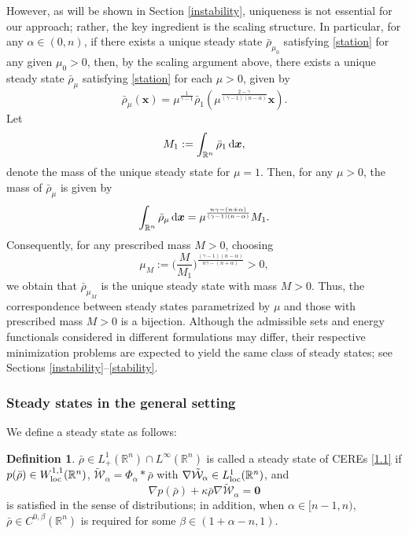 \documentclass[reqno,11pt]{amsart}
\numberwithin{equation}{section}
\theoremstyle{definition}
\newtheorem{definition}[theorem]{Definition}
\def\dd{{\, \rm d}}
\begin{document}
However, as will be shown in Section \ref{instability}, uniqueness is not essential for our approach; 
rather, the key ingredient is the scaling structure.
In particular, for any $\alpha \in (0,n)$, 
if there exists a unique steady state $\bar{\rho}_{\mu_0}$ 
satisfying \eqref{station} for any given $\mu_0 > 0$, 
then, by the scaling argument above, 
there exists a unique steady state $\bar{\rho}_\mu$ 
satisfying \eqref{station} for each $\mu > 0$, given by
\[
\bar{\rho}_\mu(\boldsymbol{x})
= \mu^\frac{1}{\gamma - 1}\bar{\rho}_1(\mu^\frac{2-\gamma}{(\gamma - 1)(n-\alpha)} \boldsymbol{x}).
\]
Let
\[  M_1 := \int_{\mathbb{R}^n} \bar{\rho}_1 \dd \boldsymbol{x},
    \]
denote the mass of the unique steady state for $\mu = 1$.
Then, for any $\mu>0$, the mass of $\bar{\rho}_\mu$ is given by
    \[ \int_{\mathbb{R}^n} \bar{\rho}_\mu \dd \boldsymbol{x} = \mu^\frac{n\gamma - (n + \alpha)}{(\gamma-1)(n-\alpha)} M_1.
    \]
Consequently, for any prescribed mass $M>0$, choosing
    \[ \mu_M := \Big(\frac{M}{M_1}\Big)^\frac{(\gamma - 1)(n - \alpha)}{n\gamma - (n + \alpha)} > 0,
    \]
 we obtain that $\bar{\rho}_{\mu_M}$ is the unique steady state with mass $M>0$. 
Thus, the correspondence between steady states parametrized by $\mu$ 
 and those with prescribed mass $M>0$ is a bijection. 
 Although the admissible sets and energy functionals considered in different formulations may differ,
 their respective minimization problems are expected to yield the same class of steady states; 
 see Sections \ref{instability}--\ref{stability}.



\subsubsection{Steady states in the general setting}
We define a steady state as follows:
\begin{definition}\label{definesteady}
$\bar{\rho} \in L^1_+(\mathbb{R}^n) \cap L^\infty(\mathbb{R}^n)$ is 
called a steady state of CEREs \eqref{1.1} 
if $p(\bar{\rho}) \in {W}^{1,1}_\text{\rm loc}(\mathbb{R}^n)$, $\mathcal{\tilde{W}}_\alpha=\Phi_\alpha\ast \bar{\rho}$ with
$\nabla \mathcal{\tilde{W}}_\alpha \in L^1_\text{\rm loc}(\mathbb{R}^n)$, and
\[
\nabla p(\bar{\rho}) + \kappa \bar{\rho} \nabla \mathcal{\tilde{W}}_\alpha = \boldsymbol{0}
\]
is satisfied in the sense of distributions{\rm ;} in addition, 
when $\alpha \in [n-1,n)$, 
$\bar{\rho} \in C^{0,\beta}(\mathbb{R}^n)$ is required for some $\beta \in (1 + \alpha - n,1)$.
\end{definition}
\end{document}
